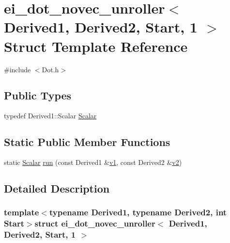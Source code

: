 \hypertarget{structei__dot__novec__unroller_3_01_derived1_00_01_derived2_00_01_start_00_011_01_4}{\section{ei\-\_\-dot\-\_\-novec\-\_\-unroller$<$ Derived1, Derived2, Start, 1 $>$ Struct Template Reference}
\label{structei__dot__novec__unroller_3_01_derived1_00_01_derived2_00_01_start_00_011_01_4}
}


{\ttfamily \#include $<$Dot.\-h$>$}

\subsection*{Public Types}
\begin{DoxyCompactItemize}
\item 
typedef Derived1\-::\-Scalar \hyperlink{structei__dot__novec__unroller_3_01_derived1_00_01_derived2_00_01_start_00_011_01_4_a3eae7f98e95e3ca591464ac0dc698edf}{Scalar}
\end{DoxyCompactItemize}
\subsection*{Static Public Member Functions}
\begin{DoxyCompactItemize}
\item 
static \hyperlink{structei__dot__novec__unroller_3_01_derived1_00_01_derived2_00_01_start_00_011_01_4_a3eae7f98e95e3ca591464ac0dc698edf}{Scalar} \hyperlink{structei__dot__novec__unroller_3_01_derived1_00_01_derived2_00_01_start_00_011_01_4_ad4fbf4a27b46b12a2037bdd2c9efbe8a}{run} (const Derived1 \&\hyperlink{glext_8h_aabdd9aabede45fcf97cea04f88d2ad60}{v1}, const Derived2 \&\hyperlink{glext_8h_ae35401c8c2fcdcc48c20ba325ee473ea}{v2})
\end{DoxyCompactItemize}


\subsection{Detailed Description}
\subsubsection*{template$<$typename Derived1, typename Derived2, int Start$>$struct ei\-\_\-dot\-\_\-novec\-\_\-unroller$<$ Derived1, Derived2, Start, 1 $>$}



